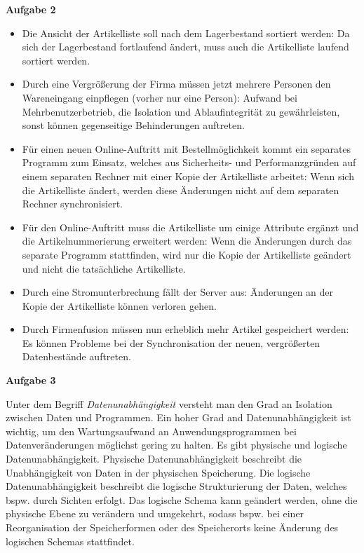\documentclass[a4paper,12pt]{article}
\newcommand{\Aufgabe}[1]{
        {
        \vspace*{0.5cm}
        \textbf{Aufgabe #1}
        \vspace*{0.2cm}
    }
}
\begin{document}
    \Aufgabe{2}
    \begin{itemize}
        \item Die Ansicht der Artikelliste soll nach dem Lagerbestand sortiert werden:
        \newline Da sich der Lagerbestand fortlaufend ändert, muss auch die Artikelliste laufend sortiert werden.
        \item Durch eine Vergrößerung der Firma müssen jetzt mehrere Personen den Wareneingang einpflegen
        (vorher nur eine Person):
        \newline Aufwand bei Mehrbenutzerbetrieb, die Isolation und Ablaufintegrität zu gewährleisten, sonst können
        gegenseitige Behinderungen auftreten.
        \item Für einen neuen Online-Auftritt mit Bestellmöglichkeit kommt ein separates Programm zum Einsatz,
        welches aus Sicherheits- und Performanzgründen auf einem separaten Rechner mit einer Kopie der Artikelliste arbeitet:
        \newline Wenn sich die Artikelliste ändert, werden diese Änderungen nicht auf dem separaten Rechner synchronisiert.
        \item Für den Online-Auftritt muss die Artikelliste um einige Attribute ergänzt und die Artikelnummerierung erweitert werden:
        \newline Wenn die Änderungen durch das separate Programm stattfinden, wird nur die Kopie der Artikelliste
        geändert und nicht die tatsächliche Artikelliste.
        \item Durch eine Stromunterbrechung fällt der Server aus:
        \newline Änderungen an der Kopie der Artikelliste können verloren gehen.
        \item Durch Firmenfusion müssen nun erheblich mehr Artikel gespeichert werden:
        \newline Es können Probleme bei der Synchronisation der neuen, vergrößerten Datenbestände auftreten.
    \end{itemize}

    \Aufgabe{3}
    \newline Unter dem Begriff \emph{Datenunabhängigkeit} versteht man den Grad an Isolation zwischen Daten und Programmen.
    Ein hoher Grad and Datenunabhängigkeit ist wichtig, um den Wartungsaufwand an Anwendungsprogrammen bei Datenveränderungen
    möglichst gering zu halten. Es gibt physische und logische Datenunabhängigkeit. Physische Datenunabhängigkeit
    beschreibt die Unabhängigkeit von Daten in der physischen Speicherung. Die logische Datenunabhängigkeit
    beschreibt die logische Strukturierung der Daten, welches bspw. durch Sichten erfolgt. Das logische Schema kann geändert
    werden, ohne die physische Ebene zu verändern und umgekehrt, sodass bspw. bei einer Reorganisation der Speicherformen
    oder des Speicherorts keine Änderung des logischen Schemas stattfindet.
\end{document}
